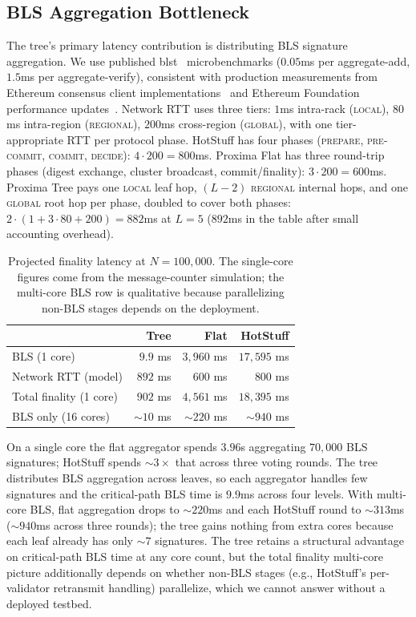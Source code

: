 \documentclass[conference]{IEEEtran}
\begin{document}
\subsection{BLS Aggregation Bottleneck}

The tree's primary latency contribution is distributing BLS signature aggregation. We use published blst~\cite{blst} microbenchmarks ($0.05$ms per aggregate-add, $1.5$ms per aggregate-verify), consistent with production measurements from Ethereum consensus client implementations~\cite{lighthouse-bls, drake-bls} and Ethereum Foundation performance updates~\cite{eth2update8}. Network RTT uses three tiers: $1$ms intra-rack (\textsc{local}), $80$ms intra-region (\textsc{regional}), $200$ms cross-region (\textsc{global}), with one tier-appropriate RTT per protocol phase. HotStuff has four phases (\textsc{prepare}, \textsc{pre-commit}, \textsc{commit}, \textsc{decide}): $4 \cdot 200 = 800$ms. Proxima Flat has three round-trip phases (digest exchange, cluster broadcast, commit/finality): $3 \cdot 200 = 600$ms. Proxima Tree pays one \textsc{local} leaf hop, $(L{-}2)$ \textsc{regional} internal hops, and one \textsc{global} root hop per phase, doubled to cover both phases: $2 \cdot (1 + 3 \cdot 80 + 200) = 882$ms at $L{=}5$ ($892$ms in the table after small accounting overhead).

\begin{table}[!htbp]
  \caption{Projected finality latency at $N{=}100{,}000$. The single-core figures come from the message-counter simulation; the multi-core BLS row is qualitative because parallelizing non-BLS stages depends on the deployment.}
  \label{tab:latency}
  \centering
  \small
  \begin{tabular}{@{}lrrr@{}}
    \toprule
     & \textbf{Tree} & \textbf{Flat} & \textbf{HotStuff} \\
    \midrule
    BLS (1 core) & $9.9$ ms & $3{,}960$ ms & $17{,}595$ ms \\
    Network RTT (model) & $892$ ms & $600$ ms & $800$ ms \\
    Total finality (1 core) & $902$ ms & $4{,}561$ ms & $18{,}395$ ms \\
    \midrule
    BLS only (16 cores) & $\sim\!10$ ms & $\sim\!220$ ms & $\sim\!940$ ms \\
    \bottomrule
  \end{tabular}
\end{table}

On a single core the flat aggregator spends $3.96$s aggregating $70{,}000$ BLS signatures; HotStuff spends $\sim\!3\times$ that across three voting rounds. The tree distributes BLS aggregation across leaves, so each aggregator handles few signatures and the critical-path BLS time is $9.9$ms across four levels. With multi-core BLS, flat aggregation drops to $\sim\!220$ms and each HotStuff round to $\sim\!313$ms ($\sim\!940$ms across three rounds); the tree gains nothing from extra cores because each leaf already has only $\sim\!7$ signatures. The tree retains a structural advantage on critical-path BLS time at any core count, but the total finality multi-core picture additionally depends on whether non-BLS stages (e.g., HotStuff's per-validator retransmit handling) parallelize, which we cannot answer without a deployed testbed.
\end{document}
